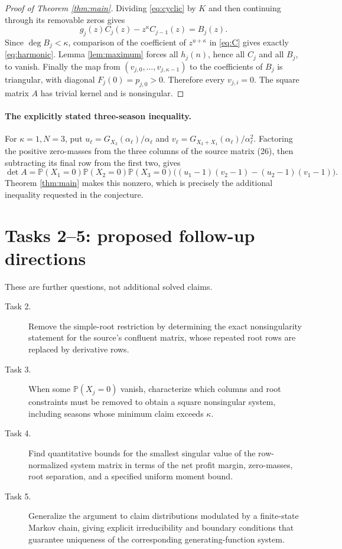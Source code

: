 \documentclass[11pt]{article}
\begin{document}
\begin{proof}[Proof of Theorem \ref{thm:main}]
Dividing \eqref{eq:cyclic} by $K$ and then continuing through
its removable zeros gives
\begin{equation}\label{eq:C}
 g_j(z)C_j(z)-z^\kappa C_{j-1}(z)=B_j(z).
\end{equation}
Since $\deg B_j<\kappa$, comparison of the coefficient of
$z^{u+\kappa}$ in \eqref{eq:C} gives exactly
\eqref{eq:harmonic}. Lemma \ref{lem:maximum} forces all
$h_j(n)$, hence all $C_j$ and all $B_j$, to vanish.
Finally the map from $(v_{j,0},\ldots,v_{j,\kappa-1})$ to
the coefficients of $B_j$ is triangular, with diagonal
$F_j(0)=p_{j,0}>0$. Therefore every $v_{j,i}=0$.
The square matrix $A$ has trivial kernel and is nonsingular.
\end{proof}

\paragraph{The explicitly stated three-season inequality.}
For $\kappa=1,N=3$, put
$u_\ell=G_{X_3}(\alpha_\ell)/\alpha_\ell$ and
$v_\ell=G_{X_3+X_1}(\alpha_\ell)/\alpha_\ell^2$.
Factoring the positive zero-masses from the three columns of
the source matrix (26), then subtracting its final row from
the first two, gives
\[
 \det A=
 \mathbb P(X_1=0)\mathbb P(X_2=0)\mathbb P(X_3=0)
 \bigl((u_1-1)(v_2-1)-(u_2-1)(v_1-1)\bigr).
\]
Theorem \ref{thm:main} makes this nonzero, which is precisely
the additional inequality requested in the conjecture.

\section*{Tasks 2--5: proposed follow-up directions}
These are further questions, not additional solved claims.
\begin{description}
\item[Task 2.] Remove the simple-root restriction by determining
the exact nonsingularity statement for the source's confluent
matrix, whose repeated root rows are replaced by derivative rows.
\item[Task 3.] When some $\mathbb P(X_j=0)$ vanish, characterize
which columns and root constraints must be removed to obtain a
square nonsingular system, including seasons whose minimum claim
exceeds $\kappa$.
\item[Task 4.] Find quantitative bounds for the smallest singular
value of the row-normalized system matrix in terms of the net
profit margin, zero-masses, root separation, and a specified
uniform moment bound.
\item[Task 5.] Generalize the argument to claim distributions
modulated by a finite-state Markov chain, giving explicit
irreducibility and boundary conditions that guarantee uniqueness
of the corresponding generating-function system.
\end{description}
\end{document}
